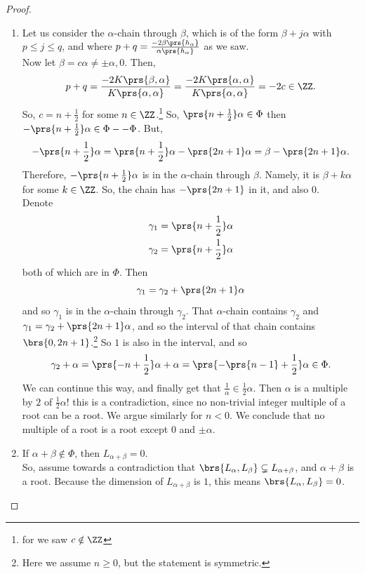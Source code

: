 \documentclass[10pt,a4paper,twoside,openany,hidelinks]{book}
\begin{document}
\begin{proof}
\begin{enumerate}
\item Let us consider the $\alpha$-chain through $\beta$, which is of the form $\beta + j\alpha$ with $p \leq j \leq q$, and where $p+q = \frac{-2 \beta\prs{h_{\alpha}}}{\alpha\prs{h_{\alpha}}}$ as we saw.\\
Now let $\beta = c\alpha \neq \pm \alpha, 0$. Then,
\[p+q = \frac{-2K\prs{\beta,\alpha}}{K\prs{\alpha,\alpha}} = \frac{-2K\prs{\alpha,\alpha}}{K\prs{\alpha,\alpha}} = -2c \in \ZZ\text{.}\]
So, $c = n + \frac{1}{2}$  for some $n \in \ZZ$.\footnote{for we saw $c \notin \ZZ$}
So, $\prs{n+\frac{1}{2}} \alpha \in \Phi$ then $-\prs{n+\frac{1}{2}}\alpha \in \Phi - -\Phi$.
But,
\[-\prs{n+\frac{1}{2}}\alpha = \prs{n+\frac{1}{2}} \alpha - \prs{2n + 1} \alpha = \beta - \prs{2n + 1}\alpha\text{.}\]
Therefore, $-\prs{n+\frac{1}{2}}\alpha$ is in the $\alpha$-chain through $\beta$. Namely, it is $\beta + k\alpha$ for some $k \in \ZZ$.
So, the chain has $-\prs{2n+1}$ in it, and also $0$.
\\
Denote
\begin{align*}
\gamma_1 &= \prs{n+\frac{1}{2}}\alpha \\
\gamma_2 &= \-\prs{n+\frac{1}{2}} \alpha
\end{align*}
both of which are in $\Phi$. Then
\[\gamma_1 = \gamma_2 + \prs{2n+1}\alpha\]
and so $\gamma_1$ is in the $\alpha$-chain through $\gamma_2$. That $\alpha$-chain contains $\gamma_2$ and $\gamma_1 = \gamma_2 + \prs{2n + 1}\alpha$, and so the interval of that chain contains $\brs{0,2n+1}$.\footnote{Here we assume $n\geq 0$, but the statement is symmetric.}
So $1$ is also in the interval, and so \[\gamma_2 + \alpha = \prs{-n + \frac{1}{2}}\alpha + \alpha = \prs{-\prs{n-1} + \frac{1}{2}} \alpha \in \Phi\text{.}\]
We can continue this way, and finally get that $\frac{1}{\alpha} \in \frac{1}{2}\alpha$.
Then $\alpha$ is a multiple by $2$ of $\frac{1}{2}\alpha$! this is a contradiction, since no non-trivial integer multiple of a root can be a root.
We argue similarly for $n < 0$.
We conclude that no multiple of a root is a root except $0$ and $\pm \alpha$.
\item
If $\alpha + \beta \notin \Phi$, then $L_{\alpha + \beta} = 0$.\\
So, assume towards a contradiction that $\brs{L_{\alpha}, L_{\beta}} \subsetneq L_{\alpha + \beta}$, and $\alpha + \beta$ is a root. Because the dimension of $L_{\alpha + \beta}$ is $1$, this means $\brs{L_{\alpha}, L_{\beta}} = 0$.\\

\end{enumerate}
\end{proof}
\end{document}
